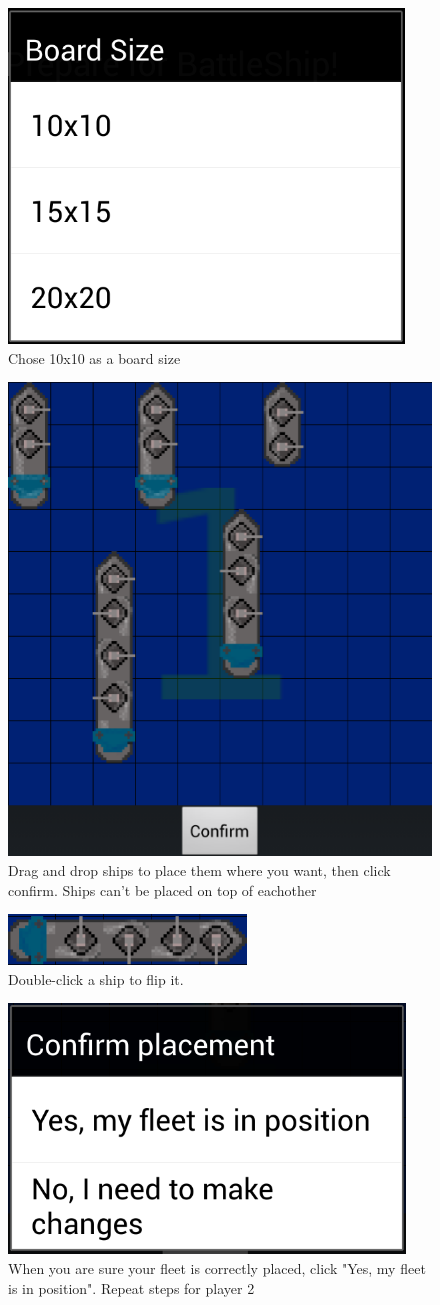 \documentclass[12pt, a4paper]{article}
\begin{document}
\begin{figure}[h!]
    \centering
    \includegraphics[width=.4\textwidth]{choseboardsize}
    \caption{Chose 10x10 as a board size}
    \label{fig:choseboardsize}
\end{figure}

\begin{figure}[h!]
    \centering
    \includegraphics[width=.4\textwidth]{placeships}
    \caption{Drag and drop ships to place them where you want, then click
confirm. Ships can’t be placed on top of eachother}
    \label{fig:placeships}
\end{figure}

\begin{figure}[h!]
    \centering
    \includegraphics[width=.4\textwidth]{flipships}
    \caption{Double-click a ship to flip it.}
    \label{fig:flipships}
\end{figure}

\begin{figure}[h!]
    \centering
    \includegraphics[width=.4\textwidth]{confirmplacement}
    \caption{When you are sure your fleet is correctly placed, click "Yes, my
fleet is in position". Repeat steps for player 2}
    \label{fig:confirmplacement}
\end{figure}
\end{document}

